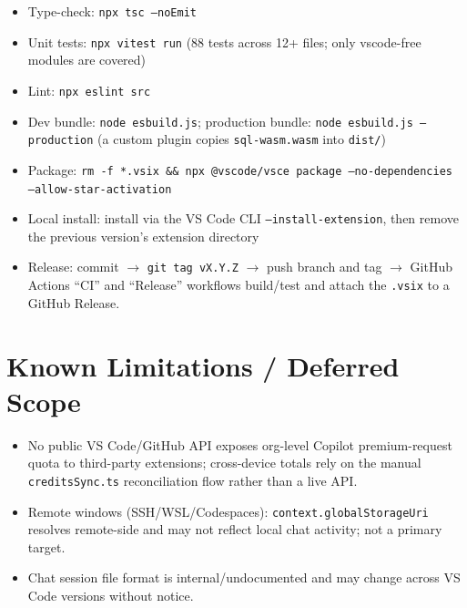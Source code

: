 \documentclass[11pt,a4paper]{article}
\newcommand{\code}[1]{\texttt{\color{lloydsblue!80!black}#1}}
\begin{document}
\begin{itemize}[leftmargin=1.4em]
  \item Type-check: \code{npx tsc --noEmit}
  \item Unit tests: \code{npx vitest run} (88 tests across 12+ files; only vscode-free modules are covered)
  \item Lint: \code{npx eslint src}
  \item Dev bundle: \code{node esbuild.js}; production bundle: \code{node esbuild.js --production} (a custom plugin copies \code{sql-wasm.wasm} into \code{dist/})
  \item Package: \code{rm -f *.vsix \&\& npx @vscode/vsce package --no-dependencies --allow-star-activation}
  \item Local install: install via the VS Code CLI \code{--install-extension}, then remove the previous version's extension directory
  \item Release: commit $\rightarrow$ \code{git tag vX.Y.Z} $\rightarrow$ push branch and tag $\rightarrow$ GitHub Actions ``CI'' and ``Release'' workflows build/test and attach the \code{.vsix} to a GitHub Release.
\end{itemize}

\section{Known Limitations / Deferred Scope}

\begin{itemize}[leftmargin=1.4em]
  \item No public VS Code/GitHub API exposes org-level Copilot premium-request quota to third-party extensions; cross-device totals rely on the manual \code{creditsSync.ts} reconciliation flow rather than a live API.
  \item Remote windows (SSH/WSL/Codespaces): \code{context.globalStorageUri} resolves remote-side and may not reflect local chat activity; not a primary target.
  \item Chat session file format is internal/undocumented and may change across VS Code versions without notice.
\end{itemize}
\end{document}
